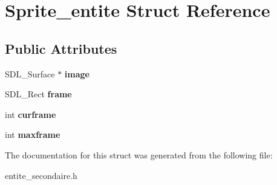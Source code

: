\hypertarget{structSprite__entite}{}\section{Sprite\+\_\+entite Struct Reference}
\label{structSprite__entite}
\subsection*{Public Attributes}
\begin{DoxyCompactItemize}
\item 
\mbox{\label{structSprite__entite_aa8dec7395027cdfa3b8143c4f02b7764}} 
S\+D\+L\+\_\+\+Surface $\ast$ {\bfseries image}
\item 
\mbox{\label{structSprite__entite_a8aa8da5e0b1bc226ebbab21e7ff299de}} 
S\+D\+L\+\_\+\+Rect {\bfseries frame}
\item 
\mbox{\label{structSprite__entite_ae7b29752e80665e4e7bd39d1c98aede3}} 
int {\bfseries curframe}
\item 
\mbox{\label{structSprite__entite_a4971a024d3c9f9695de89f11bc64cb73}} 
int {\bfseries maxframe}
\end{DoxyCompactItemize}


The documentation for this struct was generated from the following file\+:\begin{DoxyCompactItemize}
\item 
entite\+\_\+secondaire.\+h\end{DoxyCompactItemize}
